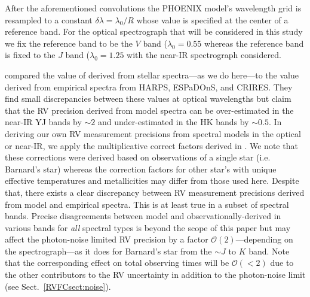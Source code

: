

After the aforementioned convolutions the PHOENIX model's wavelength grid is resampled to a
constant $\delta \lambda = \lambda_0 / R$ whose value is specified at the center of a reference band.
For the optical spectrograph that will be considered in this study we fix the reference band to be
the $V$ band ($\lambda_0 = 0.55$ \micron{)} whereas the reference band is fixed to the $J$ band
($\lambda_0 = 1.25$ \micron{)} with the near-IR spectrograph considered.

\cite{artigau18} compared the value of \sigRV{} derived from stellar spectra---as we do
here---to the value derived from empirical spectra from HARPS, ESPaDOnS, and CRIRES. They find
small discrepancies between these values at optical wavelengths but claim that the RV precision
derived from model spectra can be over-estimated in the near-IR YJ bands by $\sim 2$ and 
under-estimated in the HK bands by $\sim 0.5$. In deriving our own RV measurement precisions
from spectral models in the optical or near-IR, we apply the multiplicative correct factors
derived in \cite{artigau18}. We note that these corrections were derived based on observations
of a single star (i.e. Barnard's star) whereas the correction factors for other star's with
unique effective temperatures and metallicities may differ from those used here.
Despite that, there exists a clear discrepancy between RV measurement precisions derived
from model and empirical spectra. This is at least true in a subset of spectral bands.
Precise disagreements between model and observationally-derived \sigRV{} in various
bands for \emph{all} spectral types is beyond the scope of this paper but may affect the
photon-noise limited RV precision by a factor $\mathcal{O}(2)$---depending on the
spectrograph---as it does for Barnard's star from the $\sim J$ to $K$ band. Note that the
corresponding effect on total observing times will be $\mathcal{O}(<2)$ due to 
the other contributors to the RV uncertainty in addition to the photon-noise limit (see
Sect.~\ref{RVFCsect:noise}).

